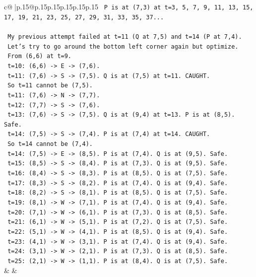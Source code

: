 \documentclass{article}
\begin{document}
{\begin{supertabular}{c@{$\;$}|p{.15\linewidth}@{}p{.15\linewidth}p{.15\linewidth}p{.15\linewidth}p{.15\linewidth}p{.15\linewidth}}
{{{\texttt{   P is at (7,3) at t=3, 5, 7, 9, 11, 13, 15, 17, 19, 21, 23, 25, 27, 29, 31, 33, 35, 37...} \\
\\ 
\texttt{   My previous attempt failed at t=11 (Q at 7,5) and t=14 (P at 7,4).} \\
\texttt{   Let's try to go around the bottom left corner again but optimize.} \\
\texttt{   From (6,6) at t=9.} \\
\texttt{   t=10: (6,6) {-}> E {-}> (7,6).} \\
\texttt{   t=11: (7,6) {-}> S {-}> (7,5). Q is at (7,5) at t=11. CAUGHT.} \\
\texttt{   So t=11 cannot be (7,5).} \\
\texttt{   t=11: (7,6) {-}> N {-}> (7,7).} \\
\texttt{   t=12: (7,7) {-}> S {-}> (7,6).} \\
\texttt{   t=13: (7,6) {-}> S {-}> (7,5). Q is at (9,4) at t=13. P is at (8,5). Safe.} \\
\texttt{   t=14: (7,5) {-}> S {-}> (7,4). P is at (7,4) at t=14. CAUGHT.} \\
\texttt{   So t=14 cannot be (7,4).} \\
\texttt{   t=14: (7,5) {-}> E {-}> (8,5). P is at (7,4). Q is at (9,5). Safe.} \\
\texttt{   t=15: (8,5) {-}> S {-}> (8,4). P is at (7,3). Q is at (9,5). Safe.} \\
\texttt{   t=16: (8,4) {-}> S {-}> (8,3). P is at (8,5). Q is at (7,5). Safe.} \\
\texttt{   t=17: (8,3) {-}> S {-}> (8,2). P is at (7,4). Q is at (9,4). Safe.} \\
\texttt{   t=18: (8,2) {-}> S {-}> (8,1). P is at (8,5). Q is at (7,5). Safe.} \\
\texttt{   t=19: (8,1) {-}> W {-}> (7,1). P is at (7,4). Q is at (9,4). Safe.} \\
\texttt{   t=20: (7,1) {-}> W {-}> (6,1). P is at (7,3). Q is at (8,5). Safe.} \\
\texttt{   t=21: (6,1) {-}> W {-}> (5,1). P is at (7,2). Q is at (7,5). Safe.} \\
\texttt{   t=22: (5,1) {-}> W {-}> (4,1). P is at (8,5). Q is at (9,4). Safe.} \\
\texttt{   t=23: (4,1) {-}> W {-}> (3,1). P is at (7,4). Q is at (9,4). Safe.} \\
\texttt{   t=24: (3,1) {-}> W {-}> (2,1). P is at (7,3). Q is at (8,5). Safe.} \\
\texttt{   t=25: (2,1) {-}> W {-}> (1,1). P is at (8,4). Q is at (7,5). Safe.} \\
            }
        }
    }
    & & \\ \\


\end{supertabular}}
\end{document}
